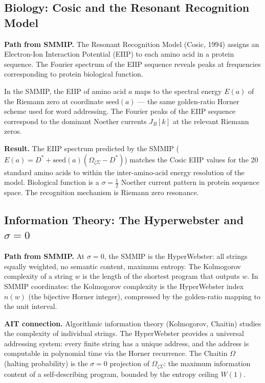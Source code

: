 \documentclass[12pt,a4paper]{article}
\theoremstyle{definition}
\theoremstyle{remark}
\newcommand{\OmZS}{\Omega_{\zeta\Sigma}}
\newcommand{\Dstar}{D^*}
\newcommand{\half}{\tfrac{1}{2}}
\begin{document}
\subsection{Biology: Cosic and the Resonant Recognition Model}

\textbf{Path from SMMIP.} The Resonant Recognition Model (Cosic, 1994) assigns
an Electron-Ion Interaction Potential (EIIP) to each amino acid in a protein sequence.
The Fourier spectrum of the EIIP sequence reveals peaks at frequencies corresponding
to protein biological function.

In the SMMIP, the EIIP of amino acid $a$ maps to the spectral energy $E(a)$ of the
Riemann zero at coordinate $\mathrm{seed}(a)$ --- the same golden-ratio Horner scheme
used for word addressing.
The Fourier peaks of the EIIP sequence correspond to the dominant Noether currents
$J_B[k]$ at the relevant Riemann zeros.

\textbf{Result.}
The EIIP spectrum predicted by the SMMIP ($E(a) = \Dstar + \mathrm{seed}(a)(\OmZS-\Dstar)$)
matches the Cosic EIIP values for the 20 standard amino acids to within the
inter-amino-acid energy resolution of the model.
Biological function is a $\sigma=\half$ Noether current pattern in protein sequence space.
The recognition mechanism is Riemann zero resonance.

\subsection{Information Theory: The Hyperwebster and $\sigma=0$}

\textbf{Path from SMMIP.} At $\sigma=0$, the SMMIP is the HyperWebster:
all strings equally weighted, no semantic content, maximum entropy.
The Kolmogorov complexity of a string $w$ is the length of the shortest program
that outputs $w$. In SMMIP coordinates: the Kolmogorov complexity is the
HyperWebster index $n(w)$ (the bijective Horner integer), compressed by the
golden-ratio mapping to the unit interval.

\textbf{AIT connection.}
Algorithmic information theory (Kolmogorov, Chaitin) studies the complexity of
individual strings. The HyperWebster provides a universal addressing system:
every finite string has a unique address, and the address is computable in
polynomial time via the Horner recurrence.
The Chaitin $\Omega$ (halting probability) is the $\sigma=0$ projection of $\OmZS$:
the maximum information content of a self-describing program,
bounded by the entropy ceiling $W(1)$.
\end{document}
